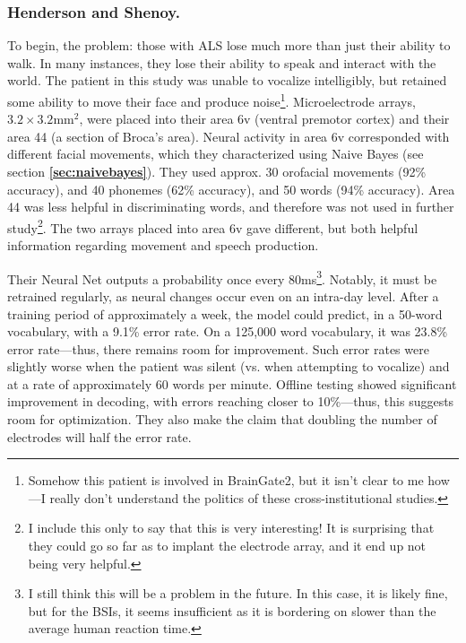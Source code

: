 \subsubsection{Henderson and Shenoy.}

To begin, the problem: those with ALS lose much more than just their ability to walk. In many instances, they lose their ability to speak and interact with the world. The patient in this study was unable to vocalize intelligibly, but retained some ability to move their face and produce noise\footnote{Somehow this patient is involved in BrainGate2, but it isn't clear to me how---I really don't understand the politics of these cross-institutional studies.}. Microelectrode arrays, $3.2 \times 3.2 \mathrm{mm}^2$, were placed into their area 6v (ventral premotor cortex) and their area 44 (a section of Broca's area). Neural activity in area 6v corresponded with different facial movements, which they characterized using Naive Bayes (see section \textbf{\ref{sec:naivebayes}}). They used approx. 30 orofacial movements (92\% accuracy), and 40 phonemes (62\% accuracy), and 50 words (94\% accuracy). Area 44 was less helpful in discriminating words, and therefore was not used in further study\footnote{I include this only to say that this is very interesting! It is surprising that they could go so far as to implant the electrode array, and it end up not being very helpful.}. The two arrays placed into area 6v gave different, but both helpful information regarding movement and speech production.\newline

Their Neural Net outputs a probability once every 80ms\footnote{I still think this will be a problem in the future. In this case, it is likely fine, but for the BSIs, it seems insufficient as it is bordering on slower than the average human reaction time.}. Notably, it must be retrained regularly, as neural changes occur even on an intra-day level. After a training period of approximately a week, the model could predict, in a 50-word vocabulary, with a 9.1\% error rate. On a 125,000 word vocabulary, it was 23.8\% error rate---thus, there remains room for improvement. Such error rates were slightly worse when the patient was silent (vs. when attempting to vocalize) and at a rate of approximately 60 words per minute. Offline testing showed significant improvement in decoding, with errors reaching closer to 10\%---thus, this suggests room for optimization. They also make the claim that doubling the number of electrodes will half the error rate. \newline

